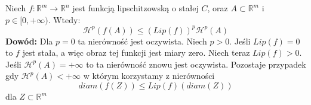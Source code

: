 \begin{lem}
	Niech $f: \mathbb{R}^m \rightarrow \mathbb{R}^n$ jest funkcją lipschitzowską o stałej $C$, oraz $A \subset \mathbb{R}^m$ i $p \in [0, + \infty)$. Wtedy: 
	$$
		\mathcal{H}^p(f(A)) \leq (Lip(f))^p \mathcal{H}^p(A)
	$$
	\textbf{Dowód:}\newline
	Dla $p=0$ ta nierówność jest oczywista. Niech $p>0$. Jeśli $Lip(f) = 0$ to $f$ jest stała, a więc obraz tej funkcji jest miary zero. Niech teraz $Lip(f)>0$. Jeśli $\mathcal{H}^p(A) = +\infty$ to ta nierówność znowu jest oczywista. Pozostaje przypadek gdy $\mathcal{H}^p(A) < +\infty$ w którym korzystamy z nierówności $$
		diam(f(Z)) \leq Lip(f)(diam(Z))
	$$
	dla $Z \subset \mathbb{R}^m$ 
\end{lem}